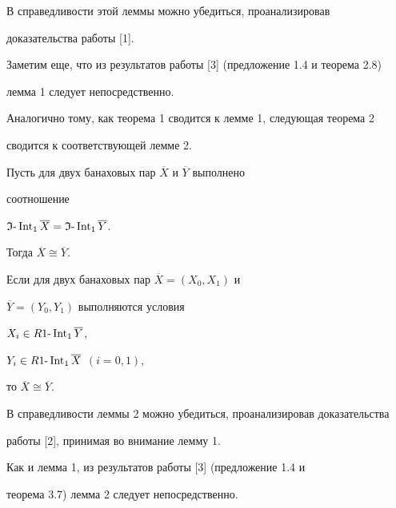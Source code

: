 В справедливости этой леммы можно убедиться, проанализировав 


доказательства работы [1]. 


Заметим еще, что из результатов работы [3] (предложение 1.4 и теорема 2.8) 


лемма 1 следует непосредственно.





Аналогично тому, как теорема 1 сводится к лемме 1, следующая теорема 2 


сводится к соответствующей лемме 2.





\begin{thm}


Пусть для двух банаховых пар $\overline X$ и $\overline Y$ выполнено 


соотношение


$\frak I\text{-}\Int_1 \overline X =


\frak I\text{-}\Int_1 \overline Y$.


Тогда $\overline X \cong \overline Y$.


\end{thm}





\begin{lem}


Если для двух банаховых пар $\overline X =(X_0,X_1)$ и


$\overline Y = (Y_0,Y_1)$ выполняются условия


$X_i \in R1\text{-}\operatorname{Int}_1 \overline Y$, 


$Y_i \in R1\text{-}\operatorname{Int}_1 \overline X$ $(i=0,1)$, 


то $\overline X \cong \overline Y$.


\end{lem}





В справедливости леммы 2 можно убедиться, проанализировав доказательства 


работы [2], принимая во внимание лемму 1. 


Как и лемма 1, из результатов работы [3] (предложение 1.4 и 


теорема 3.7) лемма 2 следует непосредственно.


\medskip





